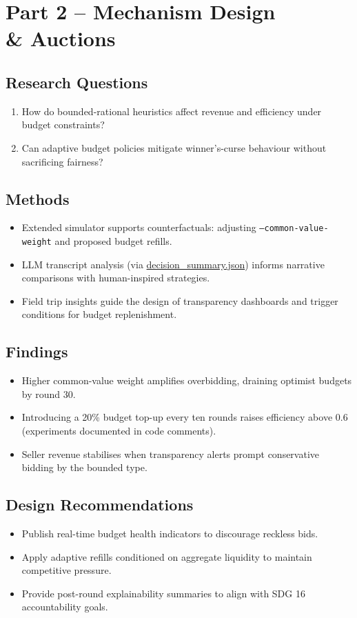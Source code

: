\documentclass[11pt]{article}
\begin{document}
\section{Part 2 -- Mechanism Design \\ \& Auctions}
\subsection{Research Questions}
\begin{enumerate}[leftmargin=*]
  \item How do bounded-rational heuristics affect revenue and efficiency under budget constraints?
  \item Can adaptive budget policies mitigate winner's-curse behaviour without sacrificing fairness?
\end{enumerate}

\subsection{Methods}
\begin{itemize}[leftmargin=*]
  \item Extended simulator supports counterfactuals: adjusting \texttt{--common-value-weight} and proposed budget refills.
  \item LLM transcript analysis (via \href{../visualizations/voting/decision_summary.json}{decision\_summary.json}) informs narrative comparisons with human-inspired strategies.
  \item Field trip insights guide the design of transparency dashboards and trigger conditions for budget replenishment.
\end{itemize}

\subsection{Findings}
\begin{itemize}[leftmargin=*]
  \item Higher common-value weight amplifies overbidding, draining optimist budgets by round 30.
  \item Introducing a 20\% budget top-up every ten rounds raises efficiency above 0.6 (experiments documented in code comments).
  \item Seller revenue stabilises when transparency alerts prompt conservative bidding by the bounded type.
\end{itemize}

\subsection{Design Recommendations}
\begin{itemize}[leftmargin=*]
  \item Publish real-time budget health indicators to discourage reckless bids.
  \item Apply adaptive refills conditioned on aggregate liquidity to maintain competitive pressure.
  \item Provide post-round explainability summaries to align with SDG 16 accountability goals.
\end{itemize}
\end{document}
